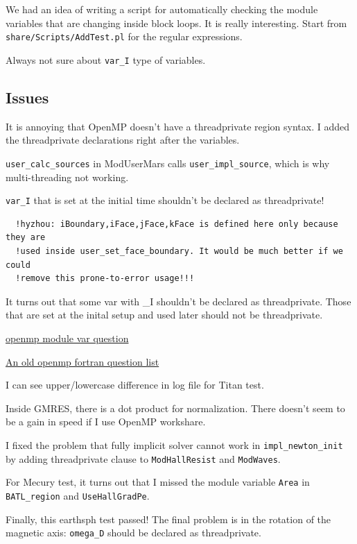 \documentclass[11pt]{book} %
\begin{document}
We had an idea of writing a script for automatically checking the module variables that are changing inside block loops. It is really interesting. Start from \verb|share/Scripts/AddTest.pl| for the regular expressions.

Always not sure about \verb|var_I| type of variables.


\subsection{Issues}

It is annoying that OpenMP doesn't have a threadprivate region syntax. I added the threadprivate declarations right after the variables.

\verb|user_calc_sources| in ModUserMars calls \verb|user_impl_source|, which is why multi-threading not working.

\verb|var_I| that is set at the initial time shouldn't be declared as threadprivate!

\begin{verbatim}
  !hyzhou: iBoundary,iFace,jFace,kFace is defined here only because they are                                          
  !used inside user_set_face_boundary. It would be much better if we could                                            
  !remove this prone-to-error usage!!!  
\end{verbatim}

It turns out that some var with \_I shouldn't be declared as threadprivate. Those that are set at the inital setup and used later should not be threadprivate.

\href{https://www.openmp.org/wp-content/uploads/finterp10.html#interp5}{openmp module var question}

\href{https://www.openmp.org/wp-content/uploads/finterp10.html}{An old openmp fortran question list}

I can see upper/lowercase difference in log file for Titan test.

Inside GMRES, there is a dot product for normalization. There doesn't seem to be a gain in speed if I use OpenMP workshare.

I fixed the problem that fully implicit solver cannot work in \verb|impl_newton_init| by adding threadprivate clause to \verb|ModHallResist| and \verb|ModWaves|.

For Mecury test,  it turns out that I missed the module variable \verb|Area| in \verb|BATL_region| and \verb|UseHallGradPe|.

Finally, this earthsph test passed! The final problem is in the rotation of the magnetic axis: \verb|omega_D| should be declared as threadprivate.
\end{document}
